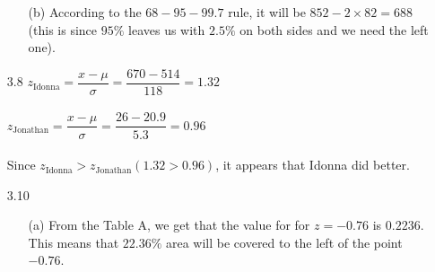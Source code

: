 \documentclass[11pt, a4paper]{article}
\begin{document}
\begin{itemize}
\begin{itemize}
\item[]

\item[(b)]
According to the $68 - 95 - 99.7$ rule, it will be
$852 - 2 \times 82 = 688$ (this is since $95\%$ leaves
us with $2.5\%$ on both sides and we need the left one).
\end{itemize}

\item[]
\item[]

\item[3.8]
$z_{\text{Idonna}} = \dfrac{x - \mu}{\sigma} = \dfrac{670 - 514}{118} = 1.32$\\\\
$z_{\text{Jonathan}} = \dfrac{x - \mu}{\sigma} = \dfrac{26 - 20.9}{5.3} = 0.96$\\\\
Since $z_{\text{Idonna}} > z_{\text{Jonathan}} (1.32 > 0.96)$, it appears that Idonna did better.

\newpage

\item[3.10]
\begin{itemize}

\item[(a)]
From the Table A, we get that the value for for $z = -0.76$ is $0.2236$.
This means that $22.36\%$ area will be covered to the left of the
point $-0.76$.
\item[]
\item[]
\item[]

\item[]


\end{itemize}
\end{itemize}
\end{document}
